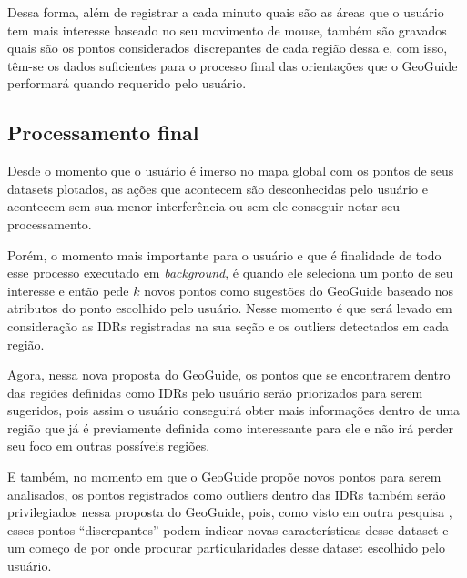 Dessa forma, além de registrar a cada minuto quais são as áreas que o usuário tem mais interesse baseado no seu movimento de mouse, também são gravados quais são os pontos considerados discrepantes de cada região dessa e, com isso, têm-se os dados suficientes para o processo final das orientações que o GeoGuide performará quando requerido pelo usuário.

\subsection{Processamento final}

Desde o momento que o usuário é imerso no mapa global com os pontos de seus datasets plotados, as ações que acontecem são desconhecidas pelo usuário e acontecem sem sua menor interferência ou sem ele conseguir notar seu processamento.

Porém, o momento mais importante para o usuário e que é finalidade de todo esse processo executado em \textit{background}, é quando ele seleciona um ponto de seu interesse e então pede $k$ novos pontos como sugestões do GeoGuide baseado nos atributos do ponto escolhido pelo usuário. Nesse momento é que será levado em consideração as IDRs registradas na sua seção e os outliers detectados em cada região.

Agora, nessa nova proposta do GeoGuide, os pontos que se encontrarem dentro das regiões definidas como IDRs pelo usuário serão priorizados para serem sugeridos, pois assim o usuário conseguirá obter mais informações dentro de uma região que já é previamente definida como interessante para ele e não irá perder seu foco em outras possíveis regiões.

E também, no momento em que o GeoGuide propõe novos pontos para serem analisados, os pontos registrados como outliers dentro das IDRs também serão privilegiados nessa proposta do GeoGuide, pois, como visto em outra pesquisa \cite{DBLP:journals/debu/FreireCVZ16}, esses pontos ``discrepantes'' podem indicar novas características desse dataset e um começo de por onde procurar particularidades desse dataset escolhido pelo usuário.
